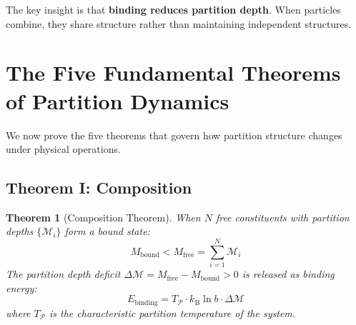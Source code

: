 \documentclass[twocolumn,10pt,a4paper]{article}
\theoremstyle{plain}
\newtheorem{theorem}{Theorem}[section]
\theoremstyle{definition}
\theoremstyle{remark}
\newcommand{\kB}{k_{\mathrm{B}}}
\newcommand{\Depth}{\mathcal{M}}
\newcommand{\Mfree}{M_{\mathrm{free}}}
\newcommand{\Mbound}{M_{\mathrm{bound}}}
\newcommand{\Partition}{\mathcal{P}}
\begin{document}
The key insight is that \textbf{binding reduces partition depth}. When particles combine, they share structure rather than maintaining independent structures.

\section{The Five Fundamental Theorems of Partition Dynamics}
\label{sec:five_theorems}

We now prove the five theorems that govern how partition structure changes under physical operations.

\subsection{Theorem I: Composition}

\begin{theorem}[Composition Theorem]
\label{thm:composition}
When $N$ free constituents with partition depths $\{\Depth_i\}$ form a bound state:
\begin{equation}
    \Mbound < \Mfree = \sum_{i=1}^N \Depth_i
\end{equation}
The partition depth deficit $\Delta\Depth = \Mfree - \Mbound > 0$ is released as binding energy:
\begin{equation}
    E_{\mathrm{binding}} = T_\Partition \cdot \kB \ln b \cdot \Delta\Depth
\end{equation}
where $T_\Partition$ is the characteristic partition temperature of the system.
\end{theorem}
\end{document}

